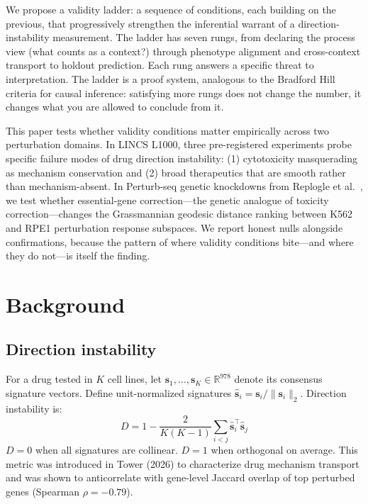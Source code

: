 \documentclass{article}
\begin{document}
We propose a validity ladder: a sequence of conditions, each building on the
previous, that progressively strengthen the inferential warrant of a
direction-instability measurement. The ladder has seven rungs, from declaring
the process view (what counts as a context?) through phenotype alignment and
cross-context transport to holdout prediction. Each rung answers a specific
threat to interpretation. The ladder is a proof system, analogous to the
Bradford Hill criteria for causal inference: satisfying more rungs does not
change the number, it changes what you are allowed to conclude from it.

This paper tests whether validity conditions matter empirically across two
perturbation domains. In LINCS L1000, three pre-registered experiments probe
specific failure modes of drug direction instability: (1) cytotoxicity
masquerading as mechanism conservation and (2) broad therapeutics that are
smooth rather than mechanism-absent. In Perturb-seq genetic knockdowns from
Replogle et al.\ \citep{replogle2022mapping}, we test whether essential-gene
correction---the genetic analogue of toxicity correction---changes the
Grassmannian geodesic distance ranking between K562 and RPE1 perturbation
response subspaces. We report honest nulls alongside confirmations, because
the pattern of where validity conditions bite---and where they do not---is
itself the finding.

\section{Background}

\subsection{Direction instability}

For a drug tested in $K$ cell lines, let $\mathbf{s}_1, \ldots,
\mathbf{s}_K \in \mathbb{R}^{978}$ denote its consensus signature vectors.
Define unit-normalized signatures $\hat{\mathbf{s}}_i = \mathbf{s}_i /
\|\mathbf{s}_i\|_2$. Direction instability is:
\begin{equation}
  D = 1 - \frac{2}{K(K-1)} \sum_{i < j}
    \hat{\mathbf{s}}_i^\top \hat{\mathbf{s}}_j
  \label{eq:direction_instability}
\end{equation}
$D = 0$ when all signatures are collinear. $D = 1$ when orthogonal on average.
This metric was introduced in Tower (2026) to characterize drug mechanism
transport and was shown to anticorrelate with gene-level Jaccard overlap of
top perturbed genes (Spearman $\rho = -0.79$).
\end{document}
